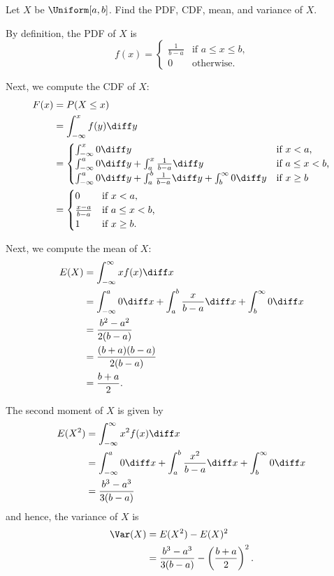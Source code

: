 \begin{problem}[Handout 12, \# 2]
  Let \(X\) be \(\Uniform[a,b]\). Find the PDF, CDF, mean, and variance of
  \(X\).
\end{problem}
\begin{solution}
  By definition, the PDF of \(X\) is
  \[
    f(x)=
    \begin{cases}
      \frac{1}{b-a}&\text{if \(a\leq x\leq b\),}\\
      0&\text{otherwise.}
    \end{cases}
  \]

  Next, we compute the CDF of \(X\):
  \begin{align*}
    F(x)&=P(X\leq x)\\
        &=\int_{-\infty}^x f(y)\diff y\\
        &=\begin{cases}
          \int_{-\infty}^x 0\diff y&\text{if \(x<a\),}\\
          \int_{-\infty}^a 0\diff y%
          +\int_a^x\frac{1}{b-a}\diff y&\text{if \(a\leq x<b\),}\\
          \int_{-\infty}^a 0\diff y%
          +\int_a^b\frac{1}{b-a}\diff y%
          +\int_b^\infty 0\diff y&\text{if \(x\geq b\)}
          \end{cases}\\
        &=\begin{cases}
          0&\text{if \(x<a\),}\\
          \frac{x-a}{b-a}&\text{if \(a\leq x<b\),}\\
          1&\text{if \(x\geq b\).}
        \end{cases}
  \end{align*}

  Next, we compute the mean of \(X\):
  \begin{align*}
    E(X)
    &=\int_{-\infty}^\infty xf(x)\diff x\\
    &=\int_{-\infty}^a 0\diff x%
      +\int_a^b\frac{x}{b-a}\diff x%
      +\int_b^\infty 0\diff x\\
    &=\frac{b^2-a^2}{2(b-a)}\\
    &=\frac{(b+a)(b-a)}{2(b-a)}\\
    &=\frac{b+a}{2}.
  \end{align*}

  The second moment of $X$ is given by
  \begin{align*}
    E(X^2)
    &=\int_{-\infty}^\infty x^2f(x)\diff x\\
    &=\int_{-\infty}^a 0\diff x%
      +\int_a^b \frac{x^2}{b-a}\diff x%
      +\int_b^\infty 0\diff x\\
    &=\frac{b^3-a^3}{3(b-a)}
  \end{align*}
  and hence, the variance of \(X\) is
  \begin{align*}
    \Var(X)
    &=E(X^2)-E(X)^2\\
    &=\frac{b^3-a^3}{3(b-a)}-\left(\frac{b+a}{2}\right)^2.
  \end{align*}
\end{solution}
\newpage

